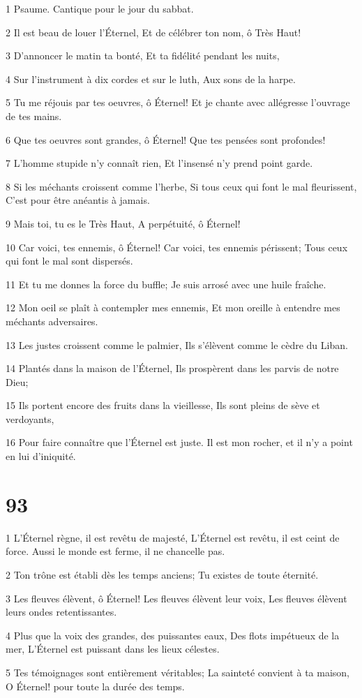\par 1 Psaume. Cantique pour le jour du sabbat.
\par 2 Il est beau de louer l'Éternel, Et de célébrer ton nom, ô Très Haut!
\par 3 D'annoncer le matin ta bonté, Et ta fidélité pendant les nuits,
\par 4 Sur l'instrument à dix cordes et sur le luth, Aux sons de la harpe.
\par 5 Tu me réjouis par tes oeuvres, ô Éternel! Et je chante avec allégresse l'ouvrage de tes mains.
\par 6 Que tes oeuvres sont grandes, ô Éternel! Que tes pensées sont profondes!
\par 7 L'homme stupide n'y connaît rien, Et l'insensé n'y prend point garde.
\par 8 Si les méchants croissent comme l'herbe, Si tous ceux qui font le mal fleurissent, C'est pour être anéantis à jamais.
\par 9 Mais toi, tu es le Très Haut, A perpétuité, ô Éternel!
\par 10 Car voici, tes ennemis, ô Éternel! Car voici, tes ennemis périssent; Tous ceux qui font le mal sont dispersés.
\par 11 Et tu me donnes la force du buffle; Je suis arrosé avec une huile fraîche.
\par 12 Mon oeil se plaît à contempler mes ennemis, Et mon oreille à entendre mes méchants adversaires.
\par 13 Les justes croissent comme le palmier, Ils s'élèvent comme le cèdre du Liban.
\par 14 Plantés dans la maison de l'Éternel, Ils prospèrent dans les parvis de notre Dieu;
\par 15 Ils portent encore des fruits dans la vieillesse, Ils sont pleins de sève et verdoyants,
\par 16 Pour faire connaître que l'Éternel est juste. Il est mon rocher, et il n'y a point en lui d'iniquité.

\chapter{93}

\par 1 L'Éternel règne, il est revêtu de majesté, L'Éternel est revêtu, il est ceint de force. Aussi le monde est ferme, il ne chancelle pas.
\par 2 Ton trône est établi dès les temps anciens; Tu existes de toute éternité.
\par 3 Les fleuves élèvent, ô Éternel! Les fleuves élèvent leur voix, Les fleuves élèvent leurs ondes retentissantes.
\par 4 Plus que la voix des grandes, des puissantes eaux, Des flots impétueux de la mer, L'Éternel est puissant dans les lieux célestes.
\par 5 Tes témoignages sont entièrement véritables; La sainteté convient à ta maison, O Éternel! pour toute la durée des temps.

